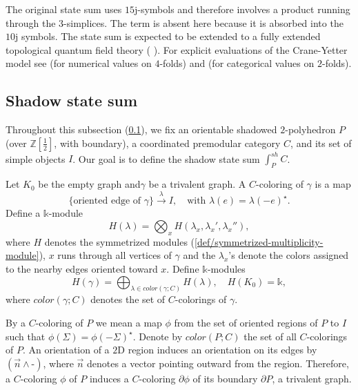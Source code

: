 \noindent The original state sum uses $15$j-symbols and therefore
involves a product running through the $3$-simplices. The term is
absent here because it is absorbed into the $10$j symbols. The
state sum is expected to be extended to a fully extended
topological quantum field theory (\cite[section 1.5]{bjs2018}
\cite{cooke2019excision}
\cite{integrating-quantum-groups-over-surfaces}
\cite{fac-homo--kirillov-tham}). For explicit evaluations of the
Crane-Yetter model see \cite{barenz/evaluation-crane-yetter} (for
numerical values on $4$-folds) and
\cite{guu/higher-genera-center} (for categorical values on
$2$-folds).

\subsection{Shadow state sum} \label{subsection/shadow-state-sum}

Throughout this subsection (\ref{subsection/shadow-state-sum}),
we fix an orientable shadowed $2$-polyhedron $P$ (over
$\mathbb{Z}[\frac{1}{2}]$, with boundary), a coordinated
premodular category $C$, and its set of simple objects $I$. Our
goal is to define the shadow state sum $\int_{P}^{sh} C$.

\begin{definition}\label{def/module-of-a-trivalent-graph}
  Let $K_{0}$ be the empty graph and$\gamma$ be a trivalent
  graph. A $C$-coloring of $\gamma$ is a map
  $$\{\mbox{oriented edge of } \gamma\} \xrightarrow{\lambda} I, \quad \mbox{with } \lambda(e) = \lambda(-e)^{\star}.$$
  Define a $\mathbb{k}$-module
  $$H(\lambda) = \bigotimes_{x} H(\lambda_{x}, \lambda_{x}', \lambda_{x}''),$$
  where $H$ denotes the symmetrized modules
  (\ref{def/symmetrized-multiplicity-module}), $x$ runs through
  all vertices of $\gamma$ and the $\lambda_{x}$'s denote the
  colors assigned to the nearby edges oriented toward $x$.
  Define $\mathbb{k}$-modules
  $$H(\gamma) = \bigoplus_{\lambda \in color(\gamma; C)} H(\lambda), \quad H(K_{0}) = \mathbb{k},$$
  where $color(\gamma; C)$ denotes the set of $C$-colorings of
  $\gamma$.
\end{definition}

By a $C$-coloring of $P$ we mean a map $\phi$ from the set of
oriented regions of $P$ to $I$ such that
$\phi(\Sigma) = \phi(-\Sigma)^{\star}$. Denote by $color(P; C)$
the set of all $C$-colorings of $P$. An orientation of a $2$D
region induces an orientation on its edges by
$(\vec{n} \wedge \text{-})$, where $\vec{n}$ denotes a vector
pointing outward from the region. Therefore, a $C$-coloring
$\phi$ of $P$ induces a $C$-coloring $\partial \phi$ of its
boundary $\partial P$, a trivalent graph.

